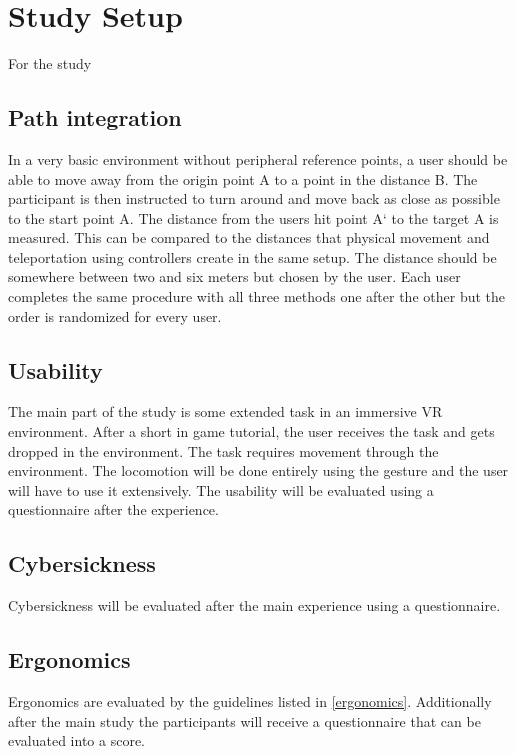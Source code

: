 \section{Study Setup}

For the study 






\subsection{Path integration}
In a very basic environment without peripheral reference points, a user should be able to move away from the origin point A to a point in the distance B. The participant is then instructed to turn around and move back as close as possible to the start point A. The distance from the users hit point A` to the target A is measured. This can be compared to the distances that physical movement and teleportation using controllers create in the same setup. The distance should be somewhere between two and six meters but chosen by the user. Each user completes the same procedure with all three methods one after the other but the order is randomized for every user.


\subsection{Usability}
The main part of the study is some extended task in an immersive VR environment. After a short in game tutorial, the user receives the task and gets dropped in the environment. The task requires movement through the environment. The locomotion will be done entirely using the gesture and the user will have to use it extensively. The usability will be evaluated using a questionnaire after the experience.


\subsection{Cybersickness}
Cybersickness will be evaluated after the main experience using a questionnaire.


\subsection{Ergonomics}
Ergonomics are evaluated by the guidelines listed in \ref{ergonomics}. Additionally after the main study the participants will receive a questionnaire that can be evaluated into a score.


